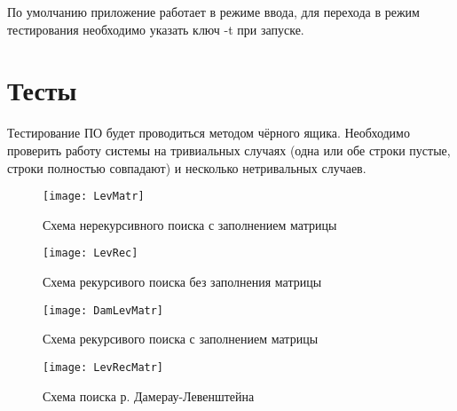         По умолчанию приложение работает в режиме ввода, для перехода в режим тестирования необходимо указать
        ключ -t при запуске. 

    \section{Тесты}
    Тестирование ПО будет проводиться методом чёрного ящика. Необходимо проверить работу системы 
    на тривиальных случаях (одна или обе строки пустые, строки полностью совпадают) 
    и несколько нетривальных случаев.

    \begin{figure}[h!]
        \centering
        \texttt{[image: LevMatr]}
        \caption{Схема нерекурсивного поиска с заполнением матрицы}
        \label{schema:matr:Levenstein}
    \end{figure}

    \begin{figure}[h!]
        \centering
        \texttt{[image: LevRec]}
        \caption{Схема рекурсивого поиска без заполнения матрицы}
        \label{schema:rec:Levenstein}
    \end{figure}

    \begin{figure}[h!]
        \centering
        \texttt{[image: DamLevMatr]}
        \caption{Схема рекурсивого поиска с заполнением матрицы}
        \label{schema:rec-matr:Levenstein}
    \end{figure}

    \begin{figure}[h!]
        \centering
        \texttt{[image: LevRecMatr]}
        \caption{Схема поиска р. Дамерау-Левенштейна}
        \label{schema:matr:Dameray-Levenstein}
    \end{figure}

\newpage